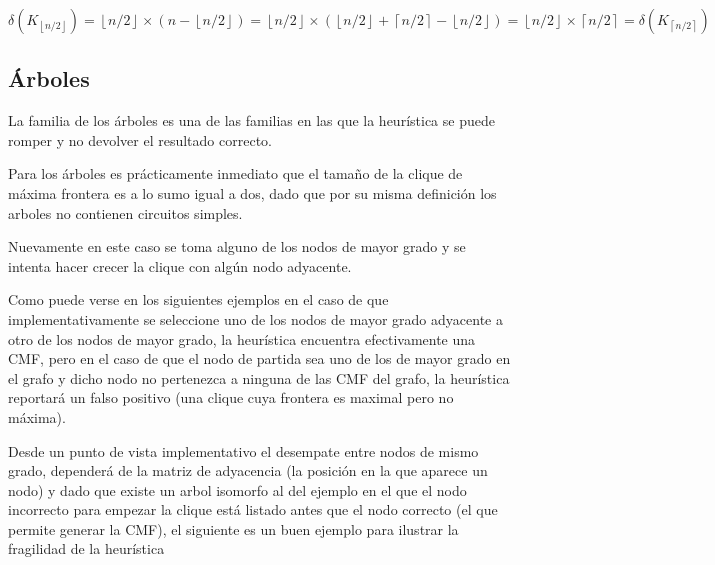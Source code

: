 	\( 
	\delta(K_{\left \lfloor{n/2}\right \rfloor}) = 
	\left \lfloor{n/2} \right \rfloor \times 
	(n - \left \lfloor{n/2} \right \rfloor ) = 
	\left \lfloor{n/2} \right \rfloor \times 
	(\left \lfloor{n/2} \right \rfloor +
	\left \lceil{n/2} \right \rceil - 
	\left \lfloor{n/2} \right \rfloor) =
	\left \lfloor{n/2} \right \rfloor \times
	\left \lceil{n/2} \right \rceil = 
	\delta(K_{\left \lceil{n/2}\right \rceil})
	\)

\subsection{\'Arboles}
La familia de los \'arboles es una de las familias en las que la heur\'istica
se puede romper y no devolver el resultado correcto. 

Para los \'arboles es pr\'acticamente inmediato que el 
tama\~no de la clique de m\'axima frontera es a lo sumo igual a dos, dado
que por su misma definici\'on los arboles no contienen circuitos simples.

Nuevamente en este caso se toma alguno de los nodos de mayor grado 
y se intenta hacer crecer la clique con alg\'un nodo adyacente.

Como puede verse en los siguientes ejemplos en el caso de que 
implementativamente se seleccione uno de los nodos de mayor grado
adyacente a otro de los nodos de mayor grado, la heur\'istica encuentra
efectivamente una CMF, pero en el caso de que el nodo de partida sea 
uno de los de mayor grado en el grafo y dicho nodo no pertenezca a
ninguna de las CMF del grafo, la heur\'istica reportar\'a un falso 
positivo (una clique cuya frontera es maximal pero no m\'axima).

Desde un punto de vista implementativo el desempate entre nodos de 
mismo grado, depender\'a de la matriz de adyacencia (la posici\'on en
la que aparece un nodo) y dado que existe un arbol isomorfo al del 
ejemplo en el que el nodo incorrecto para empezar la clique est\'a
listado antes que el nodo correcto (el que permite generar la CMF),
el siguiente es un buen ejemplo para ilustrar la fragilidad de la
heur\'istica

